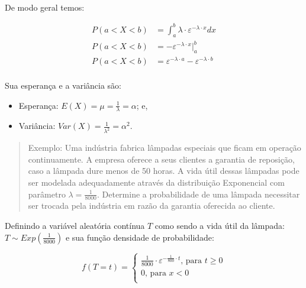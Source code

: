 \documentclass[
]{book}
\providecommand{\tightlist}{%
  \setlength{\itemsep}{0pt}\setlength{\parskip}{0pt}}
\begin{document}
~

De modo geral temos:

\hfill\break

\begin{align*}
P( a < X < b) & = \int_{a}^{b}  \lambda \cdot \varepsilon ^{- \lambda \cdot x} dx \\
P( a < X < b) & = - \varepsilon^{-\lambda \cdot x} \rvert_{a}^{b} \\ 
P( a < X < b) & = \varepsilon^{-\lambda \cdot a} - \varepsilon^{-\lambda \cdot b} \\  
\end{align*}

\hfill\break

Sua esperança e a variância são:

\hfill\break

\begin{itemize}
\tightlist
\item
  Esperança: \(E(X) = \mu = \frac{1}{\lambda}=\alpha\); e,\\
\item
  Variância: \(Var(X) = \frac{1}{\lambda^{2}}=\alpha^{2}\).
\end{itemize}

\hfill\break

\begin{quote}
Exemplo:
Uma indústria fabrica lâmpadas especiais que ficam em operação continuamente. A empresa oferece a seus clientes a garantia de reposição, caso a lâmpada dure menos de 50 horas. A vida útil dessas lâmpadas pode ser modelada adequadamente através da distribuição Exponencial com parâmetro \(\lambda = \frac{1}{8000}\). Determine a probabilidade de uma lâmpada necessitar ser trocada pela indústria em razão da garantia oferecida ao cliente.
\end{quote}

\hfill\break

Definindo a variável aleatória contínua \(T\) como sendo a vida útil da lâmpada: \(T \sim Exp (\frac{1}{8000})\) e sua função densidade de probabilidade:

\hfill\break

\[
f(T=t)=
\begin{cases}
    \frac{1}{8000} \cdot \varepsilon ^{-  \frac{1}{800} \cdot t} \text{, para } t \ge 0 \\
    0 \text{, para } x < 0\\
\end{cases}
\]

\hfill\break
\end{document}
